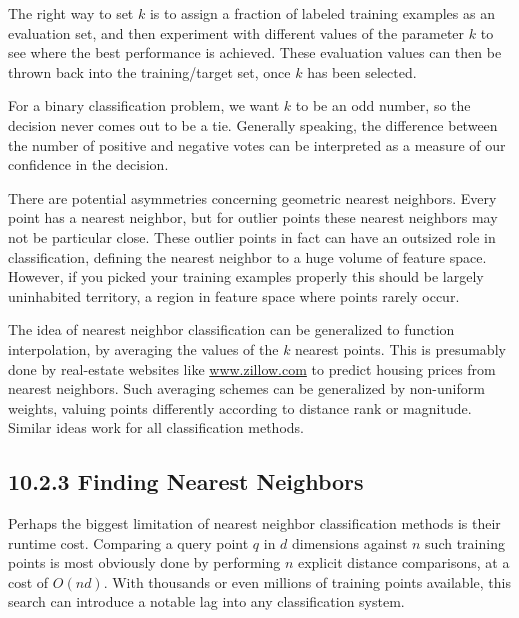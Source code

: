 \documentclass[10pt]{article}
\begin{document}
The right way to set $k$ is to assign a fraction of labeled training examples as an evaluation set, and then experiment with different values of the parameter $k$ to see where the best performance is achieved. These evaluation values can then be thrown back into the training/target set, once $k$ has been selected.

For a binary classification problem, we want $k$ to be an odd number, so the decision never comes out to be a tie. Generally speaking, the difference between the number of positive and negative votes can be interpreted as a measure of our confidence in the decision.

There are potential asymmetries concerning geometric nearest neighbors. Every point has a nearest neighbor, but for outlier points these nearest neighbors may not be particular close. These outlier points in fact can have an outsized role in classification, defining the nearest neighbor to a huge volume of feature space. However, if you picked your training examples properly this should be largely uninhabited territory, a region in feature space where points rarely occur.

The idea of nearest neighbor classification can be generalized to function interpolation, by averaging the values of the $k$ nearest points. This is presumably done by real-estate websites like \url{www.zillow.com} to predict housing prices from nearest neighbors. Such averaging schemes can be generalized by non-uniform weights, valuing points differently according to distance rank or magnitude. Similar ideas work for all classification methods.

\subsection*{10.2.3 Finding Nearest Neighbors}
Perhaps the biggest limitation of nearest neighbor classification methods is their runtime cost. Comparing a query point $q$ in $d$ dimensions against $n$ such training points is most obviously done by performing $n$ explicit distance comparisons, at a cost of $O(nd)$. With thousands or even millions of training points available, this search can introduce a notable lag into any classification system.
\end{document}
